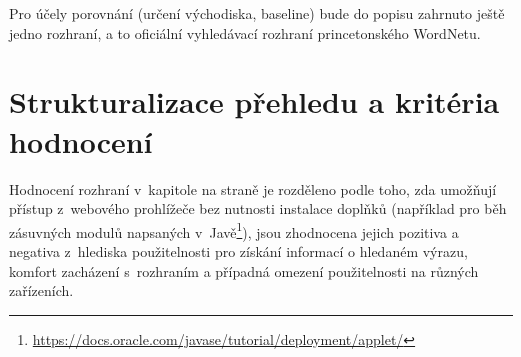 \documentclass[a4paper, 11pt, oneside, showtrims]{book}
\newcommand{\itNameRef}[1]{\textit{\nameref{#1}}}
\begin{document}

				Pro účely porovnání (určení východiska, baseline) bude do popisu zahrnuto ještě jedno rozhraní, a to oficiální vyhledávací rozhraní princetonského WordNetu.

			\section{Strukturalizace přehledu a kritéria hodnocení}
			\label{cha:structhodnoc}

				Hodnocení rozhraní v~kapitole \itNameRef{cha:porovnani} na straně \pageref{cha:porovnani} je rozděleno podle toho, zda umožňují přístup z~webového prohlížeče bez nutnosti instalace doplňků (například pro běh zásuvných modulů napsaných v~Javě\footnote{\url{https://docs.oracle.com/javase/tutorial/deployment/applet/}}), jsou zhodnocena jejich pozitiva a negativa z~hlediska použitelnosti pro získání informací o hledaném výrazu, komfort zacházení s~rozhraním a případná omezení použitelnosti na různých zařízeních. 
\end{document}
